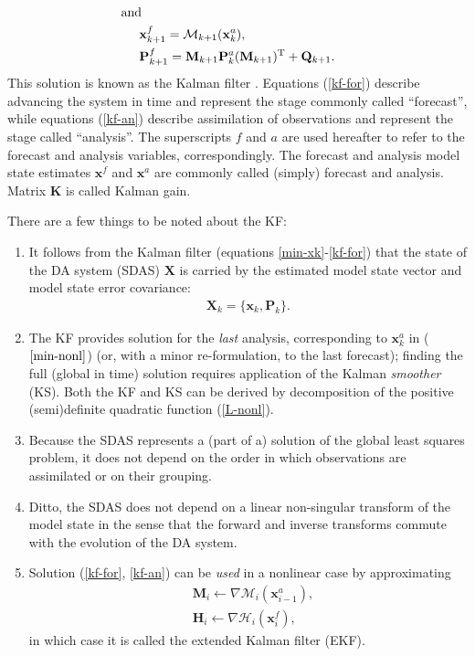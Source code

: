 \documentclass[11pt]{report}
\newcommand{\mb} {\mathbf}
\newcommand{\T}{^{\tiny \mathrm T}}
\begin{document}
\vspace{-8mm}
\begin{subequations}
  \label{kf-for}
  \begin{align}
    \label{prop-x}
    \nonumber
    & \hspace{-0.5cm} \text{and}\\
    & \mb x^f_{k+1} = \mathcal M_{k+1}(\mb x_k^a),\\
    \label{prop-P}
    & \mb P_{k+1}^f = \mb M_{k+1} \mb P_k^a (\mb M_{k+1})\T + \mb Q_{k+1}.
  \end{align}
\end{subequations}
This solution is known as the Kalman filter \citep[KF,][]{kal60}.
Equations (\ref{kf-for}) describe advancing the system in time and represent the stage commonly called ``forecast'', while equations (\ref{kf-an}) describe assimilation of observations and represent the stage called ``analysis''.
The superscripts $f$ and $a$ are used hereafter to refer to the forecast and analysis variables, correspondingly.
The forecast and analysis model state estimates $\mb x^f$ and $\mb x^a$ are commonly called (simply) forecast and analysis.
Matrix $\mb K$ is called Kalman gain.

There are a few things to be noted about the KF:
\vspace{-3mm}
\begin{enumerate}
\item It follows from the Kalman filter (equations \ref{min-xk}-\ref{kf-for}) that the state of the DA system (SDAS) $\mb X$ is carried by the estimated model state vector and model state error covariance:
\begin{align}
  \label{sdas}
  \mb X_k = \{\mb x_k, \mb P_k\}.
\end{align}
\item The KF provides solution for the \emph{last} analysis, corresponding to $\mb x_k^a$ in ($\ref{min-nonl}$) (or, with a minor re-formulation, to the last forecast); finding the full (global in time) solution requires application of the Kalman \emph{smoother} (KS).
Both the KF and KS can be derived by decomposition of the positive (semi)definite quadratic function (\ref{L-nonl}).
\item Because the SDAS represents a (part of a) solution of the global least squares problem, it does not depend on the order in which observations are assimilated or on their grouping.
\item Ditto, the SDAS does not depend on a linear non-singular transform of the model state in the sense that the forward and inverse transforms commute with the evolution of the DA system.
\item Solution (\ref{kf-for}, \ref{kf-an}) can be \emph{used} in a nonlinear case by approximating
\begin{align*}
  &\mb M_{i} \leftarrow \nabla \mathcal M_i(\mb x_{i-1}^a),\\
  &\mb H_{i} \leftarrow \nabla \mathcal H_i(\mb x_i^f),
\end{align*}
in which case it is called the extended Kalman filter (EKF).
\end{enumerate}
\end{document}
